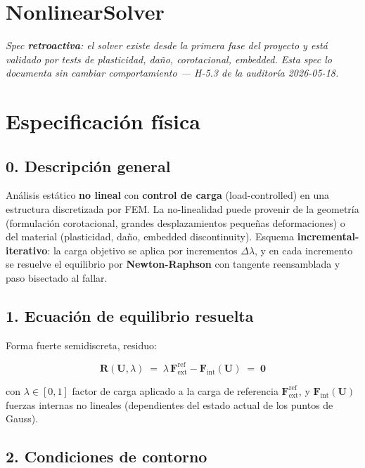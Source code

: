 \documentclass[11pt,letterpaper,oneside]{report}
\begin{document}
\newpage

\section{NonlinearSolver}



\textit{Spec \textbf{retroactiva}: el solver existe desde la primera fase del proyecto y está validado por tests de plasticidad, daño, corotacional, embedded. Esta spec lo documenta sin cambiar comportamiento --- H-5.3 de la auditoría 2026-05-18.}



\section{Especificación física}

\subsection{0. Descripción general}

Análisis estático \textbf{no lineal} con \textbf{control de carga} (load-controlled) en una estructura discretizada por FEM. La no-linealidad puede provenir de la geometría (formulación corotacional, grandes desplazamientos pequeñas deformaciones) o del material (plasticidad, daño, embedded discontinuity). Esquema \textbf{incremental-iterativo}: la carga objetivo se aplica por incrementos $\Delta\lambda$, y en cada incremento se resuelve el equilibrio por \textbf{Newton-Raphson} con tangente reensamblada y paso bisectado al fallar.

\subsection{1. Ecuación de equilibrio resuelta}

Forma fuerte semidiscreta, residuo:

\[
\mathbf R(\mathbf U, \lambda) \;=\; \lambda\,\mathbf F_{\text{ext}}^{\text{ref}} - \mathbf F_{\text{int}}(\mathbf U) \;=\; \mathbf 0
\]

con $\lambda \in [0, 1]$ factor de carga aplicado a la carga de referencia $\mathbf F_{\text{ext}}^{\text{ref}}$, y $\mathbf F_{\text{int}}(\mathbf U)$ fuerzas internas no lineales (dependientes del estado actual de los puntos de Gauss).

\subsection{2. Condiciones de contorno}
\end{document}
